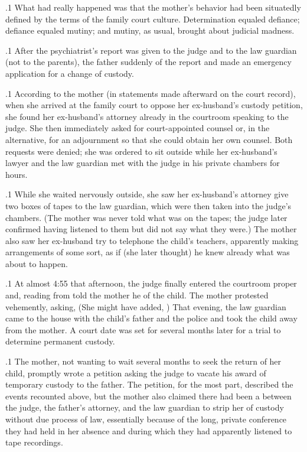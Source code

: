 \documentclass[11pt, twoside]{article}
\begin{document}
{\p.1{%
What had really happened was that the mother’s behavior had been
situatedly defined by the terms of the family court culture. Determination equaled defiance; defiance equaled mutiny; and mutiny, as usual,
brought about judicial madness.
}%

\p.1{%
After the psychiatrist’s report was given to the judge and to the law
guardian (not to the parents), the father suddenly  of the report
and made an emergency application for a change of custody.
}%

\p.1{%
According to the mother (in statements made afterward on the court
record), when she arrived at the family court to oppose her ex-husband’s
custody petition, she found her ex-husband’s attorney already in the
courtroom speaking to the judge. She then immediately asked for
court-appointed counsel or, in the alternative, for an adjournment so that she
could obtain her own counsel. Both requests were denied;
she was ordered to sit outside while her ex-husband’s lawyer and the law guardian
met with the judge in his private chambers for hours.
}%

\p.1{%
While she waited nervously outside, she saw her ex-husband’s attorney give two boxes of tapes to the law guardian, which were then taken
into the judge’s chambers. (The mother was never told what was on the
tapes; the judge later confirmed having listened to them but did not say
what they were.) The mother also saw her ex-husband try to telephone
the child’s teachers, apparently making arrangements of some sort, as if
(she later thought) he knew already what was about to happen.
}%

\p.1{%
At almost 4:55 that afternoon, the judge finally entered the courtroom
proper and, reading from  told the mother
he  of the child.
The mother protested vehemently, asking,  (She might have added, ) That evening, the law guardian
came to the house with the child’s father and the police and took the
child away from the mother. A court date was set for several months
later for a trial to determine permanent custody.
}%

\p.1{%
The mother, not wanting to wait several months to seek the return
of her child, promptly wrote a petition asking the judge to vacate his
award of temporary custody to the father. The petition, for the most
part, described the events recounted above, but the mother also
claimed there had been a  between the judge, the father’s
attorney, and the law guardian to strip her of custody without due process of law, essentially because of the long, private conference they had
held in her absence and during which they had apparently listened to
tape recordings.
}%

}
\end{document}
